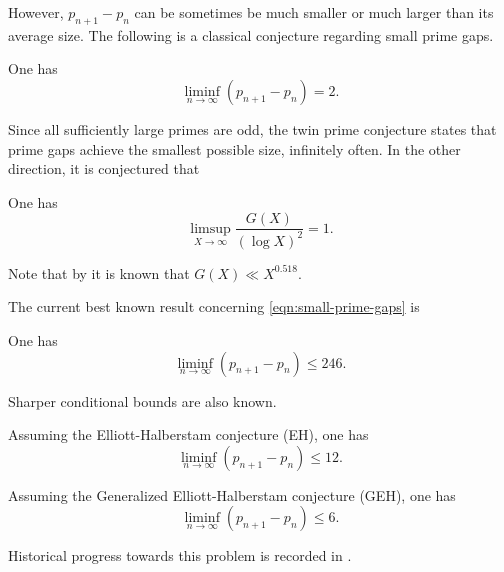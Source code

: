 However, $p_{n + 1} - p_n$ can be sometimes be much smaller or much larger than its average size. The following is a classical conjecture regarding small prime gaps.

\begin{conjecture}
One has
\[
\liminf_{n\to\infty}(p_{n + 1} - p_n) = 2.
\]
\end{conjecture}

Since all sufficiently large primes are odd, the twin prime conjecture states that prime gaps achieve the smallest possible size, infinitely often. In the other direction, it is conjectured that
\begin{conjecture}
One has
\[
\limsup_{X \to \infty}\frac{G(X)}{(\log X)^2} = 1.
\]
\end{conjecture}
Note that by  it is known that $G(X) \ll X^{0.518}$.

The current best known result concerning \eqref{eqn:small-prime-gaps} is
\begin{theorem}
One has
\[
\liminf_{n\to\infty}(p_{n + 1} - p_n) \le 246.
\]
\end{theorem}

Sharper conditional bounds are also known.
\begin{theorem}
Assuming the Elliott-Halberstam conjecture (EH), one has
\[
\liminf_{n\to\infty}(p_{n + 1} - p_n) \le 12.
\]
\end{theorem}
\begin{theorem}
Assuming the Generalized Elliott-Halberstam conjecture (GEH), one has
\[
\liminf_{n\to\infty}(p_{n + 1} - p_n) \le 6.
\]
\end{theorem}
Historical progress towards this problem is recorded in .

